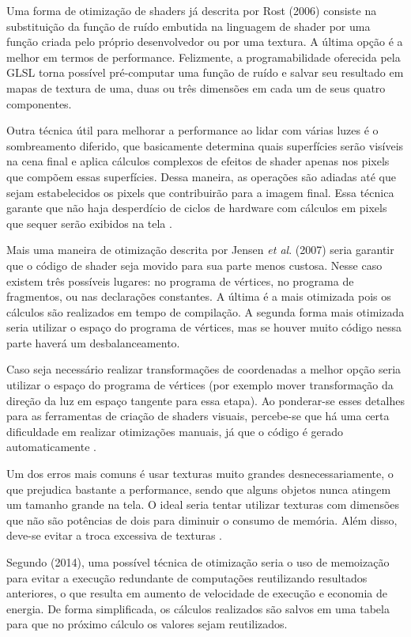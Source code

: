 Uma forma de otimização de shaders já descrita por Rost (2006) consiste na substituição da função de ruído embutida na linguagem de shader por uma função criada pelo próprio desenvolvedor ou por uma textura. A última opção é a melhor em termos de performance. Felizmente, a programabilidade oferecida pela GLSL torna possível pré-computar uma função de ruído e salvar seu resultado em mapas de textura de uma, duas ou três dimensões em cada um de seus quatro componentes.

Outra técnica útil para melhorar a performance ao lidar com várias luzes é o sombreamento diferido, que basicamente determina quais superfícies serão visíveis na cena final e aplica cálculos complexos de efeitos de shader apenas nos pixels que compõem essas superfícies. Dessa maneira, as operações são adiadas até que sejam estabelecidos os pixels que contribuirão para a imagem final. Essa técnica garante que não haja desperdício de ciclos de hardware com cálculos em pixels que sequer serão exibidos na tela \cite{GLSLBook}.

Mais uma maneira de otimização descrita por Jensen \textit{et al}. (2007) seria garantir que o código de shader seja movido para sua parte menos custosa. Nesse caso existem três possíveis lugares: no programa de vértices, no programa de fragmentos, ou nas declarações constantes. A última é a mais otimizada pois os cálculos são realizados em tempo de compilação. A segunda forma mais otimizada seria utilizar o espaço do programa de vértices, mas se houver muito código nessa parte haverá um desbalanceamento.

Caso seja necessário realizar transformações de coordenadas a melhor opção seria utilizar o espaço do programa de vértices (por exemplo mover transformação da direção da luz em espaço tangente para essa etapa). Ao ponderar-se esses detalhes para as ferramentas de criação de shaders visuais, percebe-se que há uma certa dificuldade em realizar otimizações manuais, já que o código é gerado automaticamente \cite{jensen2007shader}.

Um dos erros mais comuns é usar texturas muito grandes desnecessariamente, o que prejudica bastante a performance, sendo que alguns objetos nunca atingem um tamanho grande na tela. O ideal seria tentar utilizar texturas com dimensões que não são potências de dois para diminuir o consumo de memória. Além disso, deve-se evitar a troca excessiva de texturas \cite{riguer2002performance}.

Segundo  (2014), uma possível técnica de otimização seria o uso de memoização para evitar a execução redundante de computações reutilizando resultados anteriores, o que resulta em aumento de velocidade de execução e economia de energia. De forma simplificada, os cálculos realizados são salvos em uma tabela para que no próximo cálculo os valores sejam reutilizados.

